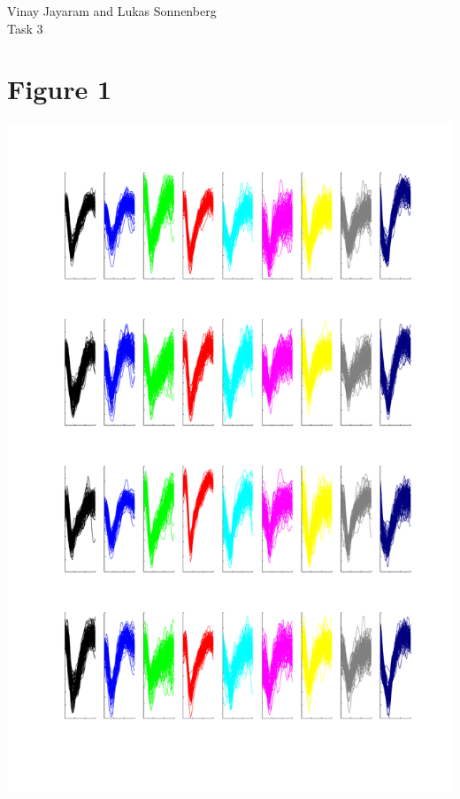 \documentclass{article}
\begin{document}
Vinay Jayaram and Lukas Sonnenberg\\
Task 3

\section{Figure 1}
\includegraphics[width=\textwidth]{Figure1.png}
\end{document}
